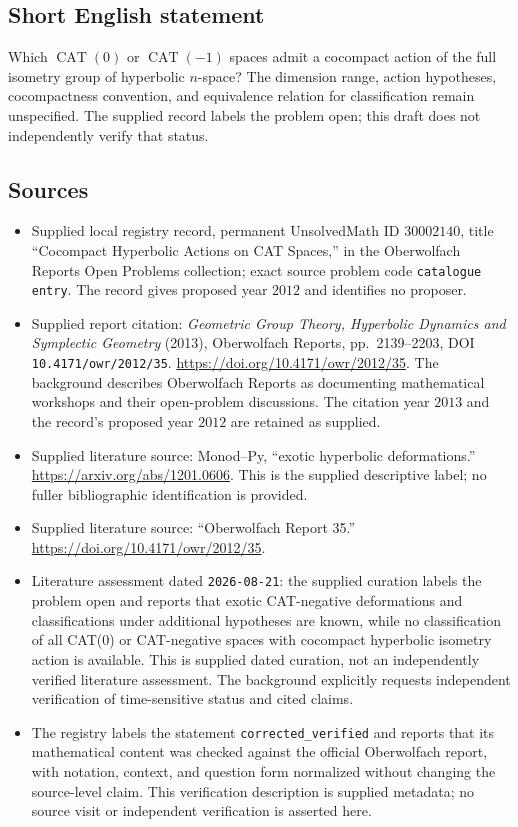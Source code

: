 \documentclass[11pt]{article}
\begin{document}
\subsection{Short English statement}
Which \(\operatorname{CAT}(0)\) or \(\operatorname{CAT}(-1)\) spaces admit a cocompact action of the full isometry group of hyperbolic \(n\)-space? The dimension range, action hypotheses, cocompactness convention, and equivalence relation for classification remain unspecified. The supplied record labels the problem open; this draft does not independently verify that status.
\subsection{Sources}
\begin{itemize}
\item Supplied local registry record, permanent UnsolvedMath ID \(30002140\), title ``Cocompact Hyperbolic Actions on CAT Spaces,'' in the Oberwolfach Reports Open Problems collection; exact source problem code \texttt{catalogue entry}. The record gives proposed year \(2012\) and identifies no proposer.
\item Supplied report citation: \emph{Geometric Group Theory, Hyperbolic Dynamics and Symplectic Geometry} (2013), Oberwolfach Reports, pp.\ 2139--2203, DOI \texttt{10.4171/owr/2012/35}. \url{https://doi.org/10.4171/owr/2012/35}. The background describes Oberwolfach Reports as documenting mathematical workshops and their open-problem discussions. The citation year \(2013\) and the record's proposed year \(2012\) are retained as supplied.
\item Supplied literature source: Monod--Py, ``exotic hyperbolic deformations.'' \url{https://arxiv.org/abs/1201.0606}. This is the supplied descriptive label; no fuller bibliographic identification is provided.
\item Supplied literature source: ``Oberwolfach Report 35.'' \url{https://doi.org/10.4171/owr/2012/35}.
\item Literature assessment dated \texttt{2026-08-21}: the supplied curation labels the problem open and reports that exotic CAT-negative deformations and classifications under additional hypotheses are known, while no classification of all CAT(0) or CAT-negative spaces with cocompact hyperbolic isometry action is available. This is supplied dated curation, not an independently verified literature assessment. The background explicitly requests independent verification of time-sensitive status and cited claims.
\item The registry labels the statement \texttt{corrected\_verified} and reports that its mathematical content was checked against the official Oberwolfach report, with notation, context, and question form normalized without changing the source-level claim. This verification description is supplied metadata; no source visit or independent verification is asserted here.
\end{itemize}
\end{document}
